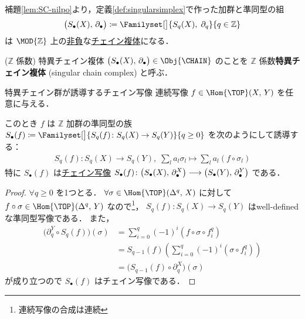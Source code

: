 \documentclass[algtopo_main]{subfiles}
\begin{document}
補題\ref{lem:SC-nilpo}より，定義\ref{def:singularsimplex}で作った加群と準同型の組
\begin{align}
    \bigl(S_\bullet(X),\, \partial_\bullet\bigr) \coloneqq \Familyset[\big]{S_q(X),\; \partial_q}{q \in \mathbb{Z}}
\end{align}
は $\MOD{\mathbb{Z}}$ 上の\hyperref[def:CC-nn]{非負}な\hyperref[def:CC]{チェイン複体}になる．

\begin{mydef}[label=def:SCC]{($\mathbb{Z}$ 係数) 特異チェイン複体}
    $\bigl(S_\bullet(X),\, \partial_\bullet\bigr) \in \Obj{\CHAIN}$ のことを $\mathbb{Z}$ 係数\textbf{特異チェイン複体} (singular chain complex) と呼ぶ．
\end{mydef}

\begin{mylem}[label=lem:SC-chain]{特異チェイン群が誘導するチェイン写像}
    連続写像 $f \in \Hom{\TOP}(X,\, Y)$ を任意に与える．
    
    このとき $f$ は $\mathbb{Z}$ 加群の準同型の族 $S_\bullet (f) \coloneqq \Familyset[\big]{S_q(f) \colon S_q(X) \to S_q(Y)}{q \ge 0}$ を次のようにして誘導する：
    \begin{align}
        S_q(f) \colon S_q(X) \to S_q(Y),\; \sum_l a_l \sigma_l \mapsto \sum_l a_l (f \circ \sigma_l)
    \end{align}
    特に $S_\bullet (f)$ は\hyperref[def:chainmap]{チェイン写像} $S_\bullet (f) \colon \bigl( S_\bullet (X),\, \partial^X_\bullet \bigr) \longrightarrow \bigl( S_\bullet (Y),\, \partial^Y_\bullet \bigr)$ である．
\end{mylem}

\begin{proof}
    $\forall  q \ge 0$ を1つとる．
    $\forall \sigma \in \Hom{\TOP} (\Delta^q,\, X)$ に対して $f \circ \sigma \in \Hom{\TOP} (\Delta^q,\, Y)$ なので\footnote{連続写像の合成は連続}，
    $S_q(f) \colon S_q(X) \to S_q(Y)$ はwell-definedな準同型写像である．
    また，
    \begin{align}
        \bigl(\partial^Y_q \circ S_q(f)\bigr)(\sigma) &= \sum_{i=0}^q (-1)^i (f \circ \sigma \circ f_i^q) \\
        &= S_{q-1}(f) \left( \sum_{i=0}^q (-1)^i (\sigma \circ f_i^q) \right) \\
        &= \bigl(S_{q-1}(f) \circ \partial^X_q\bigr)(\sigma)
    \end{align}
    が成り立つので $S_\bullet(f)$ はチェイン写像である．
\end{proof}
\end{document}
